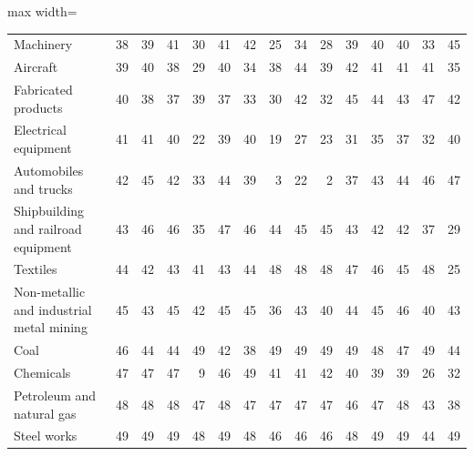 \begin{table}[!htbp]
\begin{adjustbox}{max width=\textwidth}
\begin{tabular}{lrrrrrrrrrrrrrr}
Machinery & 38 & 39 & 41 & 30 & 41 & 42 & 25 & 34 & 28 & 39 & 40 & 40 & 33 & 45 \\
Aircraft & 39 & 40 & 38 & 29 & 40 & 34 & 38 & 44 & 39 & 42 & 41 & 41 & 41 & 35 \\
Fabricated products & 40 & 38 & 37 & 39 & 37 & 33 & 30 & 42 & 32 & 45 & 44 & 43 & 47 & 42 \\
Electrical equipment & 41 & 41 & 40 & 22 & 39 & 40 & 19 & 27 & 23 & 31 & 35 & 37 & 32 & 40 \\
Automobiles and trucks & 42 & 45 & 42 & 33 & 44 & 39 & 3 & 22 & 2 & 37 & 43 & 44 & 46 & 47 \\
Shipbuilding and railroad equipment & 43 & 46 & 46 & 35 & 47 & 46 & 44 & 45 & 45 & 43 & 42 & 42 & 37 & 29 \\
Textiles & 44 & 42 & 43 & 41 & 43 & 44 & 48 & 48 & 48 & 47 & 46 & 45 & 48 & 25 \\
Non-metallic and industrial metal mining & 45 & 43 & 45 & 42 & 45 & 45 & 36 & 43 & 40 & 44 & 45 & 46 & 40 & 43 \\
Coal & 46 & 44 & 44 & 49 & 42 & 38 & 49 & 49 & 49 & 49 & 48 & 47 & 49 & 44 \\
Chemicals & 47 & 47 & 47 & 9 & 46 & 49 & 41 & 41 & 42 & 40 & 39 & 39 & 26 & 32 \\
Petroleum and natural gas & 48 & 48 & 48 & 47 & 48 & 47 & 47 & 47 & 47 & 46 & 47 & 48 & 43 & 38 \\
Steel works & 49 & 49 & 49 & 48 & 49 & 48 & 46 & 46 & 46 & 48 & 49 & 49 & 44 & 49 \\
\bottomrule
\end{tabular}
\end{adjustbox}
\end{table}
